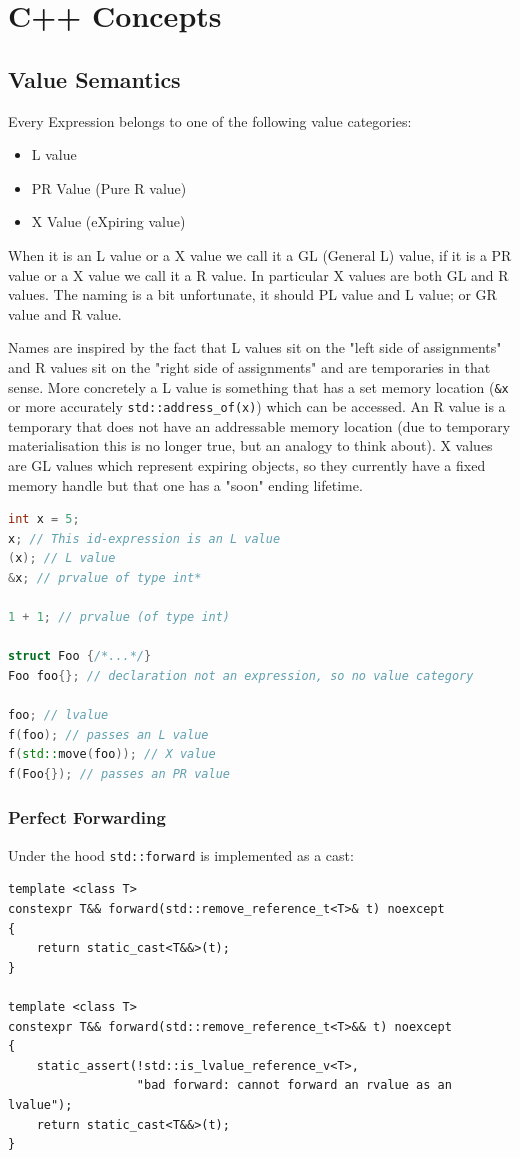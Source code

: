 \documentclass{article}
\begin{document}
\newpage
\section{C++ Concepts}
\subsection{Value Semantics}
Every Expression belongs to one of the following value categories:
\begin{itemize}
\item L value
\item PR Value (Pure R value)
\item X Value (eXpiring value)
\end{itemize}
When it is an L value or a X value we call it a GL (General L) value, if it is a PR value or a X value we call it a R value. In particular X values are both GL and R values. The naming is a bit unfortunate, it should PL value and L value; or GR value and R value.

Names are inspired by the fact that L values sit on the "left side of assignments" and R values sit on the "right side of assignments" and are temporaries in that sense. More concretely a L value is something that has a set memory location (\texttt{\&x} or more accurately \texttt{std::address\_of(x)}) which can be accessed. An R value is a temporary that does not have an addressable memory location (due to temporary materialisation this is no longer true, but an analogy to think about). X values are GL values which represent expiring objects, so they currently have a fixed memory handle but that one has a "soon" ending lifetime.
\begin{lstlisting}[language=cpp,caption={Rule of 5}]
int x = 5;
x; // This id-expression is an L value
(x); // L value
&x; // prvalue of type int*

1 + 1; // prvalue (of type int)

struct Foo {/*...*/}
Foo foo{}; // declaration not an expression, so no value category

foo; // lvalue
f(foo); // passes an L value 
f(std::move(foo)); // X value
f(Foo{}); // passes an PR value 
\end{lstlisting}

\subsubsection{Perfect Forwarding}
Under the hood \texttt{std::forward} is implemented as a cast:
\begin{lstlisting}
template <class T>
constexpr T&& forward(std::remove_reference_t<T>& t) noexcept
{
    return static_cast<T&&>(t);
}

template <class T>
constexpr T&& forward(std::remove_reference_t<T>&& t) noexcept
{
    static_assert(!std::is_lvalue_reference_v<T>,
                  "bad forward: cannot forward an rvalue as an lvalue");
    return static_cast<T&&>(t);
}
\end{lstlisting}
\end{document}
